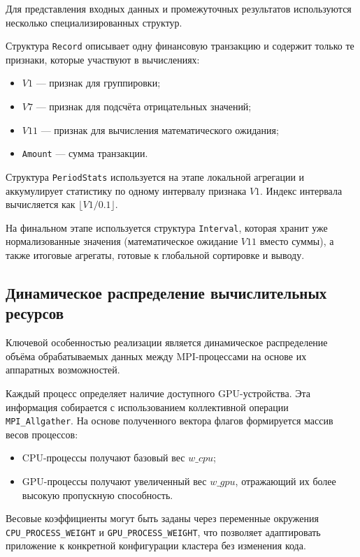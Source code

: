 \documentclass[areaset=advanced]{scrartcl}
\begin{document}
Для представления входных данных и промежуточных результатов используются
несколько специализированных структур.

Структура \texttt{Record} описывает одну финансовую транзакцию и содержит
только те признаки, которые участвуют в вычислениях:
\begin{itemize}
  \item $V1$ — признак для группировки;
  \item $V7$ — признак для подсчёта отрицательных значений;
  \item $V11$ — признак для вычисления математического ожидания;
  \item \texttt{Amount} — сумма транзакции.
\end{itemize}

Структура \texttt{PeriodStats} используется на этапе локальной агрегации и
аккумулирует статистику по одному интервалу признака $V1$. Индекс интервала
вычисляется как $\lfloor V1 / 0.1 \rfloor$.

На финальном этапе используется структура \texttt{Interval}, которая хранит
уже нормализованные значения (математическое ожидание $V11$ вместо суммы),
а также итоговые агрегаты, готовые к глобальной сортировке и выводу.

\subsection{Динамическое распределение вычислительных ресурсов}

Ключевой особенностью реализации является динамическое распределение объёма
обрабатываемых данных между MPI-процессами на основе их аппаратных возможностей.

Каждый процесс определяет наличие доступного GPU-устройства. Эта информация
собирается с использованием коллективной операции \texttt{MPI\_Allgather}.
На основе полученного вектора флагов формируется массив весов процессов:
\begin{itemize}
  \item CPU-процессы получают базовый вес $w\_{cpu}$;
  \item GPU-процессы получают увеличенный вес $w\_{gpu}$, отражающий их более
  высокую пропускную способность.
\end{itemize}

Весовые коэффициенты могут быть заданы через переменные окружения
\texttt{CPU\_PROCESS\_WEIGHT} и \texttt{GPU\_PROCESS\_WEIGHT}, что позволяет
адаптировать приложение к конкретной конфигурации кластера без изменения кода.
\end{document}
